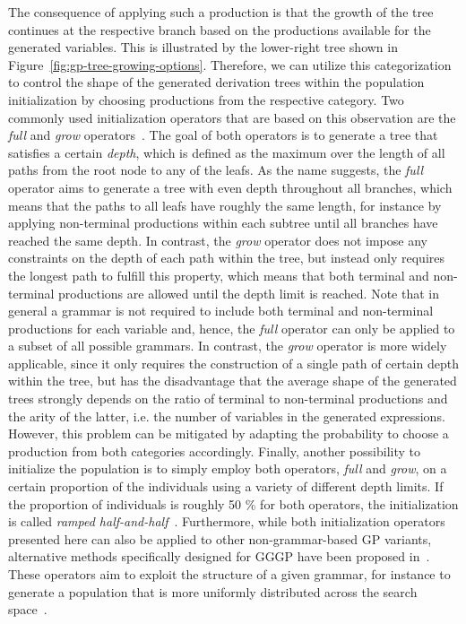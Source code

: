 The consequence of applying such a production is that the growth of the tree continues at the respective branch based on the productions available for the generated variables.
This is illustrated by the lower-right tree shown in Figure~\ref{fig:gp-tree-growing-options}. 
Therefore, we can utilize this categorization to control the shape of the generated derivation trees within the population initialization by choosing productions from the respective category.
Two commonly used initialization operators that are based on this observation are the \emph{full} and \emph{grow} operators~\cite{poli2008field}.  
The goal of both operators is to generate a tree that satisfies a certain \emph{depth}, which is defined as the maximum over the length of all paths from the root node to any of the leafs.
As the name suggests, the \emph{full} operator aims to generate a tree with even depth throughout all branches, which means that the paths to all leafs have roughly the same length, for instance by applying non-terminal productions within each subtree until all branches have reached the same depth.
In contrast, the \emph{grow} operator does not impose any constraints on the depth of each path within the tree, but instead only requires the longest path to fulfill this property, which means that both terminal and non-terminal productions are allowed until the depth limit is reached.
Note that in general a grammar is not required to include both terminal and non-terminal productions for each variable and, hence, the \emph{full} operator can only be applied to a subset of all possible grammars.
In contrast, the \emph{grow} operator is more widely applicable, since it only requires the construction of a single path of certain depth within the tree, but has the disadvantage that the average shape of the generated trees strongly depends on the ratio of terminal to non-terminal productions and the arity of the latter, i.e. the number of variables in the generated expressions.
However, this problem can be mitigated by adapting the probability to choose a production from both categories accordingly. 
Finally, another possibility to initialize the population is to simply employ both operators, \emph{full} and \emph{grow}, on a certain proportion of the individuals using a variety of different depth limits. 
If the proportion of individuals is roughly 50 \% for both operators, the initialization is called \emph{ramped half-and-half}~\cite{poli2008field,koza1994genetic}.
Furthermore, while both initialization operators presented here can also be applied to other non-grammar-based GP variants, alternative methods specifically designed for GGGP have been proposed in~\cite{garcia2006initialization,criado2020grammatically}.
These operators aim to exploit the structure of a given grammar, for instance to generate a population that is more uniformly distributed across the search space~\cite{criado2020grammatically}.

